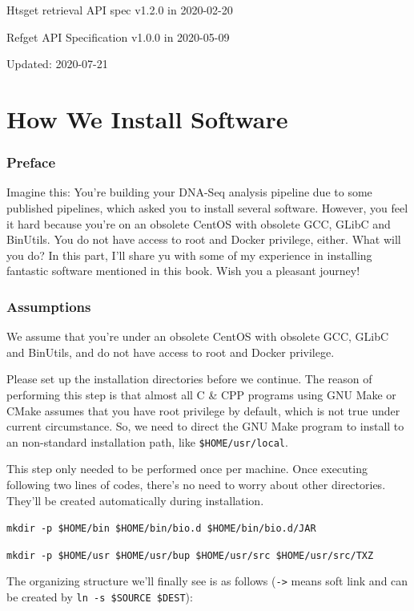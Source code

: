 \documentclass[]{article}
\begin{document}
Htsget retrieval API spec v1.2.0 in 2020-02-20

Refget API Specification v1.0.0 in 2020-05-09

Updated: 2020-07-21

\part{How We Install Software}
\section{Preface}
Imagine this: You're building your DNA-Seq analysis pipeline due to some published pipelines, which asked you to install several software. However, you feel it hard because you're on an obsolete CentOS with obsolete GCC, GLibC and BinUtils. You do not have access to root and Docker privilege, either. What will you do? In this part, I'll share yu with some of my experience in installing fantastic software mentioned in this book. Wish you a pleasant journey!

\section{Assumptions}
We assume that you're under an obsolete CentOS with obsolete GCC, GLibC and BinUtils, and do not have access to root and Docker privilege.

Please set up the installation directories before we continue. The reason of performing this step is that almost all C \& CPP programs using GNU Make or CMake assumes that you have root privilege by default, which is not true under current circumstance. So, we need to direct the GNU Make program to install to an non-standard installation path, like \verb|$HOME/usr/local|.

This step only needed to be performed once per machine. Once executing following two lines of codes, there's no need to worry about other directories. They'll be created automatically during installation.

\verb|mkdir -p $HOME/bin $HOME/bin/bio.d $HOME/bin/bio.d/JAR|

\verb|mkdir -p $HOME/usr $HOME/usr/bup $HOME/usr/src $HOME/usr/src/TXZ|

The organizing structure we'll finally see is as follows (\verb|->| means soft link and can be created by \verb|ln -s $SOURCE $DEST|):
\end{document}
